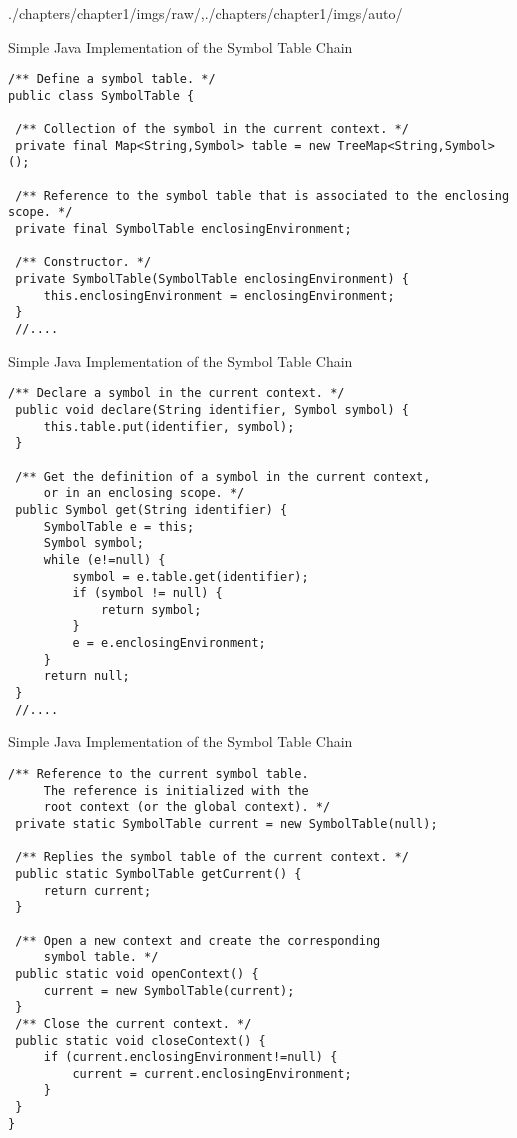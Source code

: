 \begin{graphicspathcontext}{{./chapters/chapter1/imgs/raw/},{./chapters/chapter1/imgs/auto/}}
\begin{bibunit}[apalike]
\begin{frame}[t,fragile]{{Simple Java Implementation} of the Symbol Table Chain}
\begin{lstlisting}[style=lststyle-java]
/** Define a symbol table. */
public class SymbolTable {

 /** Collection of the symbol in the current context. */
 private final Map<String,Symbol> table = new TreeMap<String,Symbol>();

 /** Reference to the symbol table that is associated to the enclosing scope. */
 private final SymbolTable enclosingEnvironment;

 /** Constructor. */
 private SymbolTable(SymbolTable enclosingEnvironment) {
     this.enclosingEnvironment = enclosingEnvironment;
 }
 //....
	\end{lstlisting}
\end{frame}

\begin{frame}[t,fragile]{{Simple Java Implementation} of the Symbol Table Chain}
	\begin{lstlisting}[style=lststyle-java]
 /** Declare a symbol in the current context. */
 public void declare(String identifier, Symbol symbol) {
     this.table.put(identifier, symbol);
 }

 /** Get the definition of a symbol in the current context,
     or in an enclosing scope. */
 public Symbol get(String identifier) {
     SymbolTable e = this;
     Symbol symbol;
     while (e!=null) {
         symbol = e.table.get(identifier);
         if (symbol != null) {
             return symbol;
         }
         e = e.enclosingEnvironment;
     }
     return null;
 }
 //....
	\end{lstlisting}
\end{frame}

\begin{frame}[t,fragile]{{Simple Java Implementation} of the Symbol Table Chain}
	\begin{lstlisting}[style=lststyle-java]
 /** Reference to the current symbol table.
     The reference is initialized with the
     root context (or the global context). */
 private static SymbolTable current = new SymbolTable(null);

 /** Replies the symbol table of the current context. */
 public static SymbolTable getCurrent() {
     return current;
 }

 /** Open a new context and create the corresponding
     symbol table. */
 public static void openContext() {
     current = new SymbolTable(current);
 }
 /** Close the current context. */
 public static void closeContext() {
     if (current.enclosingEnvironment!=null) {
         current = current.enclosingEnvironment;
     }
 }
}
	\end{lstlisting}
\end{frame}


\end{bibunit}
\end{graphicspathcontext}
